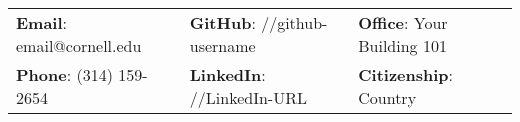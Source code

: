 \documentclass[letterpaper, 11pt]{article}
\begin{document}


\vspace{0.5cm} 
\begin{center}
\begin{tabular}{lll}
\textbf{Email}: email@cornell.edu      &
\hspace{0.55in} \textbf{GitHub}: //github-username    &
\hspace{0.4in} 	\textbf{Office}: Your Building 101 \\

\textbf{Phone}: (314) 159-2654   & 
\hspace{0.55in} \textbf{LinkedIn}: //LinkedIn-URL   & 
\hspace{0.4in} \textbf{Citizenship}: Country 
\end{tabular}
\end{center}


\setlength{\tabcolsep}{8pt}
\end{document}
